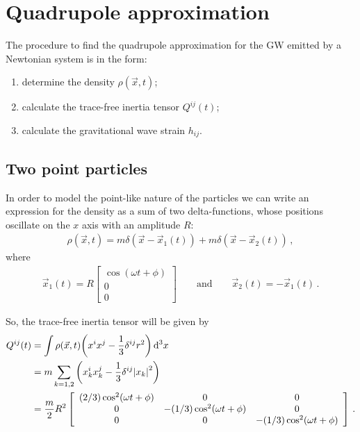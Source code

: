 \documentclass[main.tex]{subfiles}
\begin{document}
\section{Quadrupole approximation}

The procedure to find the quadrupole approximation 
for the GW emitted by a Newtonian system is in the form: 
\begin{enumerate}
    \item determine the density \(\rho (\vec{x}, t)\);
    \item calculate the trace-free inertia tensor \(Q^{ij}(t)\);
    \item calculate the gravitational wave strain \(h_{ij}\). 
\end{enumerate}

\subsection{Two point particles}

In order to model the point-like nature of the particles we can write an expression for the density as a sum of two delta-functions,
whose positions oscillate on the \(x\) axis with an amplitude \(R\):
%
\begin{align}
\rho (\vec{x}, t) = m\delta (\vec{x} - \vec{x}_1(t)) + m\delta (\vec{x} - \vec{x}_2 (t))                                                           \,,
\end{align}
%
where 
%
\begin{align}
\vec{x}_1 (t) = R \left[\begin{array}{c}
\cos(\omega t + \phi ) \\ 
0 \\ 
0
\end{array}\right]
\qquad \text{and} \qquad
\vec{x}_2 (t) = - \vec{x}_1 (t)
\,.
\end{align}


So, the trace-free inertia tensor will be given by 
%
\begin{align}
Q^{ij} (t) &= \int \rho (\vec{x}, t) \qty( x^{i} x^{j} - \frac{1}{3} \delta^{ij} r^2) \dd[3]{x}  \\
&= m \sum _{k=1, 2} \qty(x_k^{i} x_k^{j} - \frac{1}{3} \delta^{ij}  \abs{x_k}^2)  \\
&= \frac{m}{2} R^2 \left[\begin{array}{ccc}
(2/3)\cos^2 (\omega t + \phi) & 0  & 0\\ 
0 & - (1/3) \cos^2(\omega t + \phi ) & 0 \\
0 & 0 & -(1/3) \cos^2(\omega t + \phi )
\end{array}\right] 
\,.
\end{align}
%
\end{document}
